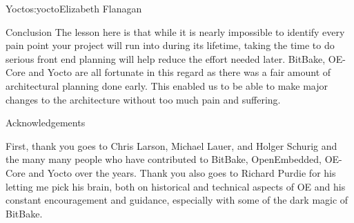 \begin{aosachapter}{Yocto}{s:yocto}{Elizabeth Flanagan}
\begin{aosasect1}{Conclusion}
The lesson here is that while it is nearly impossible to identify
every pain point your project will run into during its lifetime,
taking the time to do serious front end planning will help reduce the
effort needed later. BitBake, OE-Core and Yocto are all fortunate in
this regard as there was a fair amount of architectural planning done
early. This enabled us to be able to make major changes to the
architecture without too much pain and suffering.

\end{aosasect1}

\begin{aosasect1}{Acknowledgements}

First, thank you goes to Chris Larson, Michael Lauer, and Holger
Schurig and the many many people who have contributed to BitBake,
OpenEmbedded, OE-Core and Yocto over the years. Thank you also goes to
Richard Purdie for his letting me pick his brain, both on historical
and technical aspects of OE and his constant encouragement and
guidance, especially with some of the dark magic of BitBake.

\end{aosasect1}

\end{aosachapter}
